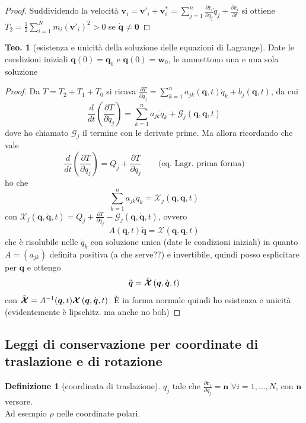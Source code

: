 \documentclass[a4paper,10pt]{article}
\theoremstyle{definition}
\newcommand{\bv}{\boldsymbol} %
\theoremstyle{indentdefinition}
\newtheorem{defn}{Definizione}[section]
\theoremstyle{indenttheorem}
\newtheorem{thm}{Teo.}
\theoremstyle{myremark}
\theoremstyle{indentgeneral}
\begin{document}
\begin{proof}
Suddividendo la velocità $\boldsymbol{v}_{i}=\boldsymbol{v}'_{i}+\boldsymbol{v}_{i}^{*}=\sum_{j=1}^{n}\frac{\partial\boldsymbol{r}_{i}}{\partial q_{j}}\dot{q}_{j}+\frac{\partial\boldsymbol{r}_{i}}{\partial t}$
si ottiene $T_{2}=\frac{1}{2}\sum_{i=1}^{N}m_{i}\left(\boldsymbol{v}'_{i}\right)^{2}>0$ se $\dot{\bv{q}}\ne \bv{0}$
\end{proof}
\begin{thm}[esistenza e unicità della soluzione delle equazioni di Lagrange]
\label{thm:esistenza-unicita-Lagrange}Date le condizioni iniziali
$\bv{q}\left(0\right)=\bv{q}_{0}$ e $\dot{\bv{q}}\left(0\right)=\bv{w}_{0}$, le 
ammettono una e una sola soluzione
\end{thm}

\begin{proof}
Da $T=T_{2}+T_{1}+T_{0}$ si ricava $\frac{\partial T}{\partial\dot{q}_{j}}=\sum_{k=1}^{n}a_{jk}(\bv{q},t)\dot{q}_{k}+b_{j}(\bv{q},t)$,
da cui
\[
\frac{d}{dt}\left(\frac{\partial T}{\partial\dot{q}_{j}}\right)=\sum_{k=1}^{n}a_{jk}\ddot{q}_{k}+\mathcal{G}_{j}\left(\bv{q},\dot{\bv{q}},t\right)
\]
dove ho chiamato $\mathcal{G}_j$ il termine con le derivate prime. Ma allora ricordando che vale
$$\frac{d}{dt}\left(\frac{\partial T}{\partial\dot{q}_{j}}\right)=Q_{j}+\frac{\partial T}{\partial q_{j}}\quad\quad \text{(eq. Lagr. prima forma)}$$
ho che 
$$\sum_{k=1}^{n}a_{jk}\ddot{q}_{k}=\mathcal{X}_j\left(\bv{q},\dot{\bv{q}},t\right)$$
con $\mathcal{X}_j\left(\bv{q},\dot{\bv{q}},t\right)=Q_{j}+\frac{\partial T}{\partial q_{j}}-\mathcal{G}_{j}\left(\bv{q},\dot{\bv{q}},t\right)$, ovvero
$$A(\bv{q},t)\ddot{\bv{q}}=\bv{\mathcal{X}}\left(\bv{q},\dot{\bv{q}},t\right)$$
che è risolubile nelle $\ddot{q}_{k}$ con soluzione unica (date le condizioni iniziali) in quanto $A=\left(a_{jk}\right)$
definita positiva (a che serve??) e invertibile, quindi posso esplicitare per $\ddot{\bv{q}}$ e  ottengo
$$\ddot{\bv{q}}=\Tilde{\bv{\mathcal{X}}}\left(\bv{q},\dot{\bv{q}},t\right)$$
con $\Tilde{\bv{\mathcal{X}}}=A^{-1}(\bv{q},t)\bv{\mathcal{X}}\left(\bv{q},\dot{\bv{q}},t\right)$. È in forma normale quindi ho esistenza e unicità (evidentemente è lipschitz. ma anche no boh)
\end{proof}

\subsection{Leggi di conservazione per coordinate di traslazione e di rotazione}
\begin{defn}[coordinata di traslazione]
\label{def:coordinata-traslazione}$q_{j}$ tale che $\frac{\partial\boldsymbol{r}_{i}}{\partial q_{j}}=\boldsymbol{n}$
$\forall i=1,\dots,N$, con $\boldsymbol{n}$ versore. \\
Ad esempio $\rho$ nelle coordinate polari.
\end{defn}
\end{document}
